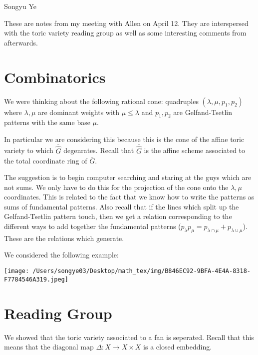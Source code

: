 \documentclass[12pt]{article}
\begin{document}
Songyu Ye

These are notes from my meeting with Allen on April 12. 
They are interspersed with the toric variety reading group as well as some interesting comments from afterwards.


\section{Combinatorics}

We were thinking about the following rational cone: quadruples $(\lambda,\mu,p_1,p_2)$ where $\lambda,\mu$ are 
dominant weights with $\mu\leq\lambda$ and $p_1,p_2$ are Gelfand-Tsetlin patterns with the same base $\mu$.

\hfill

In particular we are considering this because this is the cone of the affine toric variety to which $\bar{\hat G}$ degenrates.
Recall that $\bar{\hat G}$ is the affine scheme associated to the total coordinate ring of $\bar G$.

\hfill

The suggestion is to begin computer searching and staring at the guys which are not sums. We only have to do this for the projection of the cone onto the $\lambda,\mu$ coordinates. This is related to the fact that we know how to write the patterns as sums of fundamental patterns. Also recall that if the lines which split up the Gelfand-Tsetlin pattern touch, then we get a relation corresponding to the different ways to add together the fundamental patterns ($p_\lambda p_\mu = p_{\lambda\cap \mu} + p_{\lambda\cup \mu}$). These are the relations which generate.

\hfill 

We considered the following example: \begin{center}
    \texttt{[image: /Users/songye03/Desktop/math\_tex/img/B846EC92-9BFA-4E4A-8318-F7784546A319.jpeg]}
\end{center}

\section{Reading Group}

We showed that the toric variety associated to a fan is seperated. Recall that this means that the diagonal map $\Delta: X\to X\times X$ is a closed embedding. 

\hfill
\end{document}
